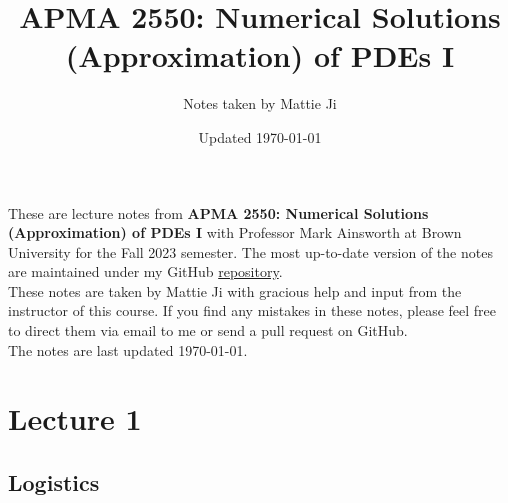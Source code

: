 \documentclass{article}
\title{APMA 2550: Numerical Solutions (Approximation) of PDEs I}
\author{Notes taken by Mattie Ji}
\date{Updated \today}
\begin{document}
\maketitle
These are lecture notes from \textbf{APMA 2550: Numerical Solutions (Approximation) of PDEs I} with Professor Mark Ainsworth at Brown University for the Fall 2023 semester. The most up-to-date version of the notes are maintained under my GitHub \href{https://github.com/maroon-scorch}{repository}.\\

These notes are taken by Mattie Ji with gracious help and input from the instructor of this course. If you find any mistakes in these notes, please feel free to direct them via email to me or send a pull request on GitHub.\\

The notes are last updated \today.
\tableofcontents
\newpage

\section{Lecture 1}

\subsection{Logistics}
\end{document}
